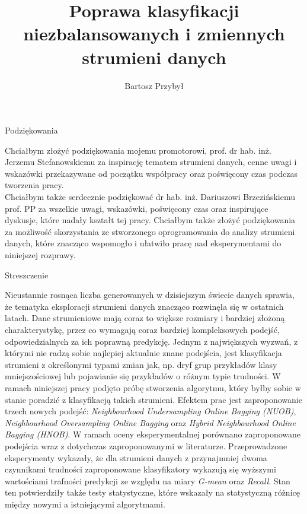\documentclass[polish,master,a4paper,oneside,11pt]{ppfcmthesis}
\author{%
   Bartosz Przybył \album{136785}}
\title{Poprawa klasyfikacji niezbalansowanych i zmiennych strumieni danych}
\begin{document}
\frontmatter\pagestyle{empty}%
\maketitle\cleardoublepage%

\newpage\null\thispagestyle{empty}\newpage
\begin{center}
    \huge Podziękowania
\end{center}
Chciałbym złożyć podziękowania mojemu promotorowi, prof. dr hab. inż. Jerzemu Stefanowskiemu za inspirację tematem strumieni danych, cenne uwagi i wskazówki przekazywane od początku współpracy oraz poświęcony czas podczas tworzenia pracy.\\

\noindent Chciałbym także serdecznie podziękować dr hab. inż. Dariuszowi Brzezińskiemu prof. PP za wszelkie uwagi, wskazówki, poświęcony czas oraz inspirujące dyskusje, które nadały kształt tej pracy. Chciałbym także złożyć podziękowania za możliwość skorzystania ze stworzonego oprogramowania do analizy strumieni danych, które znacząco wspomogło i ułatwiło pracę nad eksperymentami do niniejszej rozprawy.


\newpage\null\thispagestyle{empty}\newpage
\newpage
\begin{center}
    \huge Streszczenie
\end{center}
Nieustannie rosnąca liczba generowanych w dzisiejszym świecie danych sprawia, że tematyka eksploracji strumieni danych znacząco rozwinęła się w ostatnich latach. Dane strumieniowe mają coraz to większe rozmiary i bardziej złożoną charakterystykę, przez co wymagają coraz bardziej kompleksowych podejść, odpowiedzialnych za ich poprawną predykcję. Jednym z największych wyzwań, z którymi nie radzą sobie najlepiej aktualnie znane podejścia, jest klasyfikacja strumieni z określonymi typami zmian jak, np. dryf grup przykładów klasy mniejszościowej lub pojawianie się przykładów o różnym typie trudności. W ramach niniejszej pracy podjęto próbę stworzenia algorytmu, który byłby sobie w stanie poradzić z klasyfikacją takich strumieni. Efektem prac jest zaproponowanie trzech nowych podejść: \textit{Neighbourhood Undersampling Online Bagging (NUOB)}, \textit{Neighbourhood Oversampling Online Bagging} oraz \textit{Hybrid Neighbourhood Online Bagging (HNOB)}. W ramach oceny eksperymentalnej porównano zaproponowane podejścia wraz z dotychczas zaproponowanymi w literaturze. Przeprowadzone eksperymenty wykazały, że dla strumieni danych z przynajmniej dwoma czynnikami trudności zaproponowane klasyfikatory wykazują się wyższymi wartościami trafności predykcji ze względu na miary \textit{G-mean} oraz \textit{Recall}. Stan ten potwierdziły także testy statystyczne, które wskazały na statystyczną różnicę między nowymi a istniejącymi algorytmami.\\\\
\end{document}
